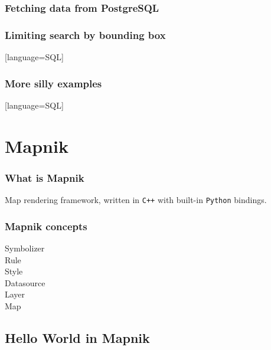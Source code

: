 \documentclass[17pt]{beamer}
\begin{document}
\begin{frame}
  \frametitle{Fetching data from PostgreSQL}
  
\end{frame}

\begin{frame}
  \frametitle{Limiting search by bounding box}
  [language=SQL]
\end{frame}

\begin{frame}
  \frametitle{More silly examples}
  [language=SQL]
\end{frame}

\section{Mapnik}

\begin{frame}
  \frametitle{What is Mapnik}
  Map rendering framework, written in \texttt{C++} with built-in \texttt{Python} bindings.
\end{frame}

\begin{frame}
  \frametitle{Mapnik concepts}
  \begin{description}
  \item[Symbolizer] 
  \item[Rule] 
  \item[Style] 
  \item[Datasource] 
  \item[Layer] 
  \item[Map] 
  \end{description}
\end{frame}

\subsection{Hello World in Mapnik}
\end{document}
